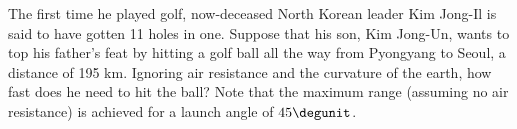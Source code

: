 The first time he played golf, now-deceased North Korean leader Kim Jong-Il is said to have gotten 11 holes
in one. Suppose that his son, Kim Jong-Un, wants to top his father's feat by hitting a golf ball all the way
from Pyongyang to Seoul, a distance of 195 km. Ignoring air resistance and the curvature of
the earth, how fast does he need to hit the ball? Note that the maximum range (assuming no air
resistance) is achieved for a launch angle of $45\degunit$.
